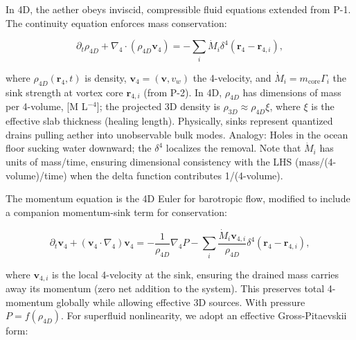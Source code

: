 \medskip
\noindent{}
\medskip

In 4D, the aether obeys inviscid, compressible fluid equations extended from P-1. The continuity equation enforces mass conservation:

\[
\partial_t \rho_{4D} + \nabla_4 \cdot (\rho_{4D} \mathbf{v}_4) = -\sum_i \dot{M}_i \delta^4(\mathbf{r}_4 - \mathbf{r}_{4,i}),
\]

where $\rho_{4D}(\mathbf{r}_4, t)$ is density, $\mathbf{v}_4 = (\mathbf{v}, v_w)$ the 4-velocity, and $\dot{M}_i = m_{\text{core}} \Gamma_i$ the sink strength at vortex core $\mathbf{r}_{4,i}$ (from P-2). In 4D, $\rho_{4D}$ has dimensions of mass per 4-volume, [M L$^{-4}$]; the projected 3D density is $\rho_{3D} \approx \rho_{4D} \xi$, where $\xi$ is the effective slab thickness (healing length). Physically, sinks represent quantized drains pulling aether into unobservable bulk modes. Analogy: Holes in the ocean floor sucking water downward; the $\delta^4$ localizes the removal. Note that $\dot{M}_i$ has units of mass/time, ensuring dimensional consistency with the LHS (mass/(4-volume)/time) when the delta function contributes 1/(4-volume).

The momentum equation is the 4D Euler for barotropic flow, modified to include a companion momentum-sink term for conservation:

\[
\partial_t \mathbf{v}_4 + (\mathbf{v}_4 \cdot \nabla_4) \mathbf{v}_4 = -\frac{1}{\rho_{4D}} \nabla_4 P - \sum_i \frac{\dot{M}_i \mathbf{v}_{4,i}}{\rho_{4D}} \delta^4(\mathbf{r}_4 - \mathbf{r}_{4,i}),
\]

where $\mathbf{v}_{4,i}$ is the local 4-velocity at the sink, ensuring the drained mass carries away its momentum (zero net addition to the system). This preserves total 4-momentum globally while allowing effective 3D sources. With pressure $P = f(\rho_{4D})$. For superfluid nonlinearity, we adopt an effective Gross-Pitaevskii form:

